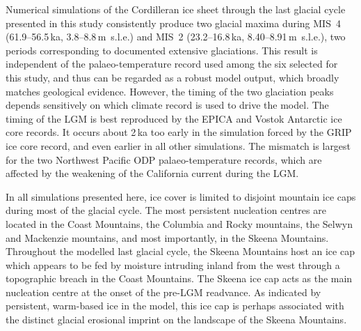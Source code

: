 \documentclass[tc]{copernicus}
\begin{document}
\conclusions
\label{sec:concl}

Numerical simulations of the Cordilleran ice sheet through the last glacial
cycle presented in this study consistently produce two glacial maxima during
MIS~4 (61.9--56.5\,ka, 3.8--8.8\,m~s.l.e.) and MIS~2 (23.2--16.8\,ka,
8.40--8.91\,m~s.l.e.), two periods corresponding to documented extensive
glaciations. This result is independent of the palaeo-temperature record used
among the six selected for this study, and thus can be regarded as a robust model
output, which broadly matches geological evidence. However, the timing of the
two glaciation peaks depends sensitively on which climate record is used to
drive the model. The timing of the LGM is best reproduced by the EPICA and
Vostok Antarctic ice core records. It occurs about 2\,ka too early in the
simulation forced by the GRIP ice core record, and even earlier in all other
simulations. The mismatch is largest for the two Northwest Pacific ODP
palaeo-temperature records, which are affected by the weakening of the
California current during the LGM.

In all simulations presented here, ice cover is limited to disjoint mountain
ice caps during most of the glacial cycle. The most persistent nucleation
centres are located in the Coast Mountains, the Columbia and Rocky mountains,
the Selwyn and Mackenzie mountains, and most importantly, in the Skeena
Mountains. Throughout the modelled last glacial cycle, the Skeena Mountains
host an ice cap which appears to be fed by moisture intruding inland from the
west through a topographic breach in the Coast Mountains. The Skeena ice cap acts
as the main nucleation centre at the onset of the pre-LGM readvance. As indicated
by persistent, warm-based ice in the model, this ice cap is perhaps associated
with the distinct glacial erosional imprint on the landscape of the Skeena
Mountains.
\end{document}
